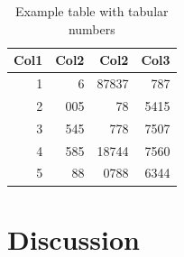 \documentclass[12pt, a4paper, oneside]{article}
\begin{document}
\begin{table}[h]
    \centering
    \renewcommand{\arraystretch}{1.2}
    \setlength{\tabcolsep}{16pt}
    \caption[Example table]{Example table with tabular numbers}
    \begin{tabular}{rrrr}
        \toprule
        \textbf{Col1} & \textbf{Col2} & \textbf{Col2} & \textbf{Col3} \\
        \midrule
        1             & 6             & 87837         & 787           \\
        2             & 005           & 78            & 5415          \\
        3             & 545           & 778           & 7507          \\
        4             & 585           & 18744         & 7560          \\
        5             & 88            & 0788          & 6344          \\
        \bottomrule
    \end{tabular}
    \label{tab:numbers}
\end{table}

\blindtext[2]

\clearpage


\section{Discussion} \label{sec:summary}

\blindtext[3]

\clearpage


\nocite{*}

{
    \raggedright
    \printbibliography
}

\clearpage


\appendix
{} \label{sec:appendix}

\renewcommand{\thesubsection}{\Alph{subsection}}
\end{document}
